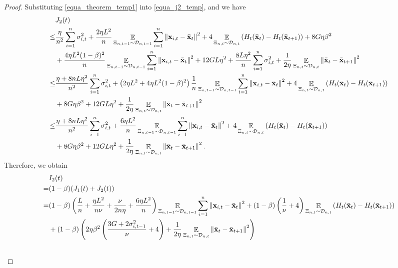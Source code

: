 \documentclass{article}
\begin{document}
\begin{proof}
Substituting \eqref{equa_theorem_temp1} into \eqref{equa_j2_temp}, and we have
\begin{align}
\nonumber
& J_2(t) \\ \nonumber 
\le & \frac{\eta}{n^2} \sum_{i=1}^n\sigma_{i,t}^2 + \frac{2\eta L^2}{n}\mathop{\mathbb{E}}_{ \Xi_{n,t-1} \sim \mathcal{D}_{n,t-1} }\sum_{i=1}^n \left\lVert{\bf x}_{i,t} - \bar{{\bf x}}_t \right\rVert^2 + 4\mathop{\mathbb{E}}_{ \Xi_{n,t} \sim \mathcal{D}_{n,t} } \left( H_t(\bar{{\bf x}}_t) - H_t(\bar{{\bf x}}_{t+1}) \right) + 8 G\eta \beta^2   \\ \nonumber
& + \frac{4\eta L^2 (1-\beta)^2}{n}\mathop{\mathbb{E}}_{ \Xi_{n,t-1} \sim \mathcal{D}_{n,t-1} }\sum_{i=1}^n \left\lVert{\bf x}_{i,t} - \bar{{\bf x}}_t\right\rVert^2 + 12GL\eta^2 + \frac{8L\eta^2}{n} \sum_{i=1}^n \sigma_{i,t}^2  + \frac{1}{2\eta} \mathop{\mathbb{E}}_{ \Xi_{n,t} \sim \mathcal{D}_{n,t} } \left\lVert \bar{{\bf x}}_t - \bar{{\bf x}}_{t+1}\right\rVert^2 \\ \nonumber
\le & \frac{\eta + 8nL\eta^2}{n^2} \sum_{i=1}^n\sigma_{i,t}^2 + \left(  2\eta L^2 + 4\eta L^2(1-\beta)^2  \right)\frac{1}{n}\mathop{\mathbb{E}}_{ \Xi_{n,t-1} \sim \mathcal{D}_{n,t-1} }\sum_{i=1}^n \left\lVert{\bf x}_{i,t} - \bar{{\bf x}}_t\right\rVert^2 + 4\mathop{\mathbb{E}}_{ \Xi_{n,t} \sim \mathcal{D}_{n,t} } \left( H_t(\bar{{\bf x}}_t) - H_t(\bar{{\bf x}}_{t+1}) \right) \\ \nonumber 
& + 8G\eta \beta^2 + 12GL\eta^2 + \frac{1}{2\eta} \mathop{\mathbb{E}}_{ \Xi_{n,t} \sim \mathcal{D}_{n,t} }\left\lVert \bar{{\bf x}}_t - \bar{{\bf x}}_{t+1}\right\rVert^2 \\ \nonumber
\le & \frac{\eta + 8nL\eta^2}{n^2} \sum_{i=1}^n\sigma_{i,t}^2 + \frac{6\eta L^2}{n}\mathop{\mathbb{E}}_{ \Xi_{n,t-1} \sim \mathcal{D}_{n,t-1} }\sum_{i=1}^n \left\lVert{\bf x}_{i,t} - \bar{{\bf x}}_t\right\rVert^2 + 4\mathop{\mathbb{E}}_{ \Xi_{n,t} \sim \mathcal{D}_{n,t} } \left( H_t(\bar{{\bf x}}_t) - H_t(\bar{{\bf x}}_{t+1}) \right) \\ \nonumber 
& + 8G\eta \beta^2 + 12GL\eta^2 + \frac{1}{2\eta} \mathop{\mathbb{E}}_{ \Xi_{n,t} \sim \mathcal{D}_{n,t} }\left\lVert \bar{{\bf x}}_t - \bar{{\bf x}}_{t+1}\right\rVert^2.
\end{align} Therefore, we obtain
\begin{align}
\nonumber
& I_2(t) \\ \nonumber 
= & (1-\beta)(J_1(t) + J_2(t)) \\ \nonumber
= &  (1-\beta)\lrincir{ \frac{L}{n} + \frac{\eta L^2}{n\nu} + \frac{\nu}{2n\eta} + \frac{6\eta L^2}{n} }\EE_{ \Xi_{n,t-1} \sim \Dcal_{n,t-1} }\sum_{i=1}^n\lrnorm{\x_{i,t} - \bar{\x}_t }^2  + (1-\beta)\lrincir{\frac{1}{\nu} + 4} \EE_{ \Xi_{n,t} \sim \Dcal_{n,t} } \lrincir{H_t(\bar{\x}_t) - H_t(\bar{\x}_{t+1})}\\ \nonumber 
&+ (1-\beta) \lrincir{ 2\eta\beta^2\lrincir{\frac{3G + 2\sigma_{i,t-1}^2}{\nu} + 4} +  \frac{1}{2\eta} \EE_{ \Xi_{n,t} \sim \Dcal_{n,t} }\lrnorm{ \bar{\x}_t - \bar{\x}_{t+1}}^2 } \\ \nonumber 

\end{align}
\end{proof}
\end{document}
